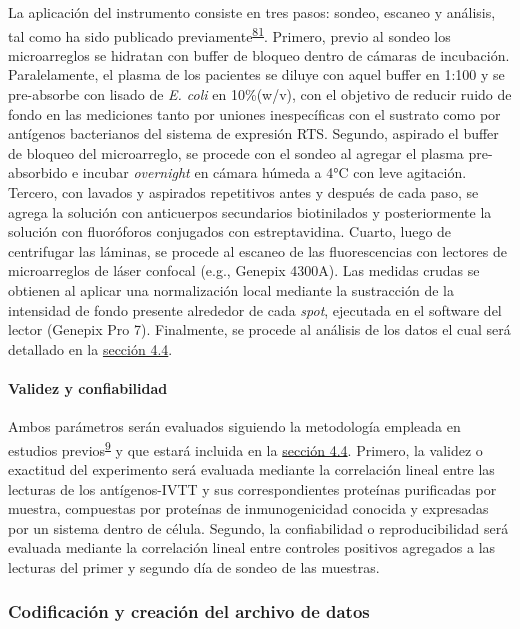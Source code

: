 \documentclass[]{article}
\let\oldparagraph\paragraph
\renewcommand{\paragraph}[1]{\oldparagraph{#1}\mbox{}}
\begin{document}
La aplicación del instrumento consiste en tres pasos: sondeo, escaneo y
análisis, tal como ha sido publicado
previamente\textsuperscript{\protect\hyperlink{ref-Driguez2015}{81}}.
Primero, previo al sondeo los microarreglos se hidratan con buffer de
bloqueo dentro de cámaras de incubación. Paralelamente, el plasma de los
pacientes se diluye con aquel buffer en 1:100 y se pre-absorbe con
lisado de \emph{E. coli} en 10\%(w/v), con el objetivo de reducir ruido
de fondo en las mediciones tanto por uniones inespecíficas con el
sustrato como por antígenos bacterianos del sistema de expresión RTS.
Segundo, aspirado el buffer de bloqueo del microarreglo, se procede con
el sondeo al agregar el plasma pre-absorbido e incubar \emph{overnight}
en cámara húmeda a 4°C con leve agitación. Tercero, con lavados y
aspirados repetitivos antes y después de cada paso, se agrega la
solución con anticuerpos secundarios biotinilados y posteriormente la
solución con fluoróforos conjugados con estreptavidina. Cuarto, luego de
centrifugar las láminas, se procede al escaneo de las fluorescencias con
lectores de microarreglos de láser confocal (e.g., Genepix 4300A). Las
medidas crudas se obtienen al aplicar una normalización local mediante
la sustracción de la intensidad de fondo presente alrededor de cada
\emph{spot}, ejecutada en el software del lector (Genepix Pro 7).
Finalmente, se procede al análisis de los datos el cual será detallado
en la \protect\hyperlink{anadata}{sección 4.4}.

\hypertarget{validez}{\paragraph{Validez y
confiabilidad}\label{validez}}

Ambos parámetros serán evaluados siguiendo la metodología empleada en
estudios
previos\textsuperscript{\protect\hyperlink{ref-crompton2010}{9}} y que
estará incluida en la \protect\hyperlink{anadata}{sección 4.4}. Primero,
la validez o exactitud del experimento será evaluada mediante la
correlación lineal entre las lecturas de los antígenos-IVTT y sus
correspondientes proteínas purificadas por muestra, compuestas por
proteínas de inmunogenicidad conocida y expresadas por un sistema dentro
de célula. Segundo, la confiabilidad o reproducibilidad será evaluada
mediante la correlación lineal entre controles positivos agregados a las
lecturas del primer y segundo día de sondeo de las muestras.

\subsubsection{Codificación y creación del archivo de
datos}\label{codificacion-y-creacion-del-archivo-de-datos}
\end{document}
